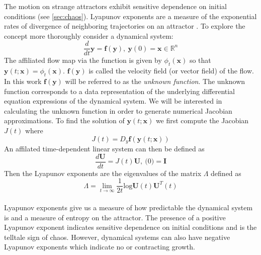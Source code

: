       The motion on strange attractors exhibit sensitive dependence on initial conditions (see \textsection\ref{sec:chaos}).
      Lyapunov exponents are a measure of the exponential rates of divergence of neighboring
      trajectories on an attractor \cite{item:3}.
      To explore the concept more thoroughly consider a dynamical system:
      \begin{equation}\label{eq:lyu}
          \frac{d}{dt}\mathbf{y}=\mathbf{f}(\mathbf{y}), \ \mathbf{y}(0)=\mathbf{x}\in\mathbb{R}^n
      \end{equation}
      The affiliated flow map via the function is given by $\phi_t(\mathbf{x})$ so that $\mathbf{y}(t;\mathbf{x})=\phi_t(\mathbf{x})$.
      $\mathbf{f}(\mathbf{y})$ is called the velocity field (or vector field) of the flow. In this work $\mathbf{f}(\mathbf{y})$ will be
        referred to as the \textit{unknown function}. The unknown function corresponds to a data representation of the
        underlying differential equation expressions of the dynamical system. We will be interested in calculating the unknown function in order to
        generate numerical Jacobian approximations. To find the solution of $\mathbf{y}(t;\mathbf{x})$
      we first compute the Jacobian $J(t)$ where
      \begin{equation}\label{eq:jac}
          J(t)=D_y\mathbf{f}(\mathbf{y}(t;\mathbf{x}))
      \end{equation}
      An affilated time-dependent linear system can then be defined as
      \begin{equation}\label{eq:linsys}
          \frac{d\mathbf{U}}{dt}=J(t)\mathbf{U}, \ \mathbf(0)=\mathbf{I}
      \end{equation}
      Then the Lyapunov exponents are the eigenvalues of the matrix $\Lambda$ defined as
      \begin{equation}
          \Lambda=\lim\limits_{t\to\infty}\frac{1}{2t}\text{log}\mathbf{U}(t)\mathbf{U}^T(t)
      \end{equation}\\

      Lyapunov exponents give us a measure of how predictable the dynamical system is and a measure of entropy on the attractor. The presence of a positive
      Lyapunov exponent indicates sensitive dependence on initial conditions and is the telltale sign of chaos.
      However, dynamical systems can also have negative Lyapunov exponents which indicate no or contracting growth.\\

